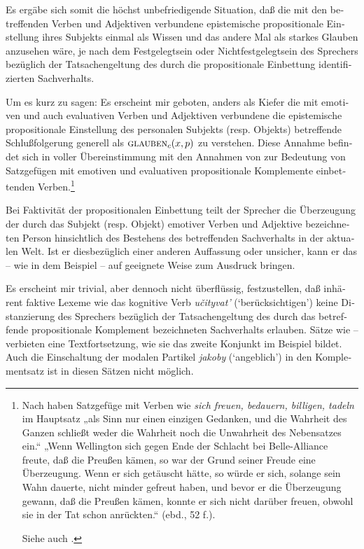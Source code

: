 \documentclass[output=paper]{langscibook}
\begin{document}
\begin{otherlanguage}{german}
Es ergäbe sich somit die höchst unbefriedigende Situation, daß die mit den betreffenden Verben und Adjektiven verbundene epistemische propositionale Einstellung ihres Subjekts einmal als Wissen und das andere Mal als starkes Glauben anzusehen wäre, je nach dem Festgelegtsein oder Nichtfestgelegtsein des Spre\-chers bezüglich der Tatsachengeltung des durch die propositionale Einbettung identifizierten Sachverhalts.

\newpage
Um es kurz zu sagen: Es erscheint mir geboten, anders als Kiefer die mit emotiven und auch evaluativen Verben und Adjektiven verbundene die epis\-te\-mi\-sche propositionale Einstellung des personalen Subjekts (resp. Objekts) betreffende Schlußfolgerung generell als $\textsc{glauben}_{c}(x, p)$ zu verstehen. Diese Annahme befindet sich in voller Übereinstimmung mit den Annahmen von \citet{frege1892uber-sinn-und-bedeutung} %
zur Bedeutung von Satzgefügen mit emotiven und evaluativen propositionale Komplemente einbettenden Verben.\footnote{Nach \citet[52]{frege1892uber-sinn-und-bedeutung} haben Satzgefüge mit Verben wie \textit{sich freuen, bedauern, billigen, tadeln} im Hauptsatz „als Sinn nur einen einzigen Gedanken, und die Wahrheit des Ganzen schließt weder die Wahrheit noch die Unwahrheit des Nebensatzes ein.“ „Wenn Wellington sich gegen Ende der Schlacht bei Belle-Alliance freute, daß die Preußen kämen, so war der Grund seiner Freude eine Überzeugung. Wenn er sich getäuscht hätte, so würde er sich, solange sein Wahn dauerte, nicht minder gefreut haben, und bevor er die Überzeugung gewann, daß die Preußen kämen, konnte er sich nicht darüber freuen, obwohl sie in der Tat schon anrückten.“ (ebd., 52 f.).

\noindent Siehe auch \citet[14, Anm. 8 und 62, incl. Anm. 4]{norrick1978factive-adjectives-and-the-theory-of-factivity}.}

Bei Faktivität der propositionalen Einbettung teilt der Sprecher die Überzeugung der durch das Subjekt (resp. Objekt) emotiver Verben und Adjektive be\-zeich\-ne\-ten Person hinsichtlich des Bestehens des betreffenden Sachverhalts in der aktualen Welt. Ist er diesbezüglich einer anderen Auffassung oder unsicher, kann er das -- wie in dem Beispiel  -- auf geeignete Weise zum Ausdruck bringen.

Es erscheint mir trivial, aber dennoch nicht überflüssig, festzustellen, daß inhärent faktive Lexeme wie das kognitive Verb \textit{učityvat’} (‘berücksichtigen’) keine Distanzierung des Sprechers bezüglich der Tatsachengeltung des durch das be\-tref\-fen\-de propositionale Komplement bezeichneten Sachverhalts erlauben. Sätze wie -- verbieten eine Textfortsetzung, wie sie das zweite Konjunkt im Beispiel  bildet. Auch die Einschaltung der modalen Partikel \textit{jakoby} (‘an\-geb\-lich’) in den Komplementsatz ist in diesen Sätzen nicht möglich.


\end{otherlanguage}
\end{document}
